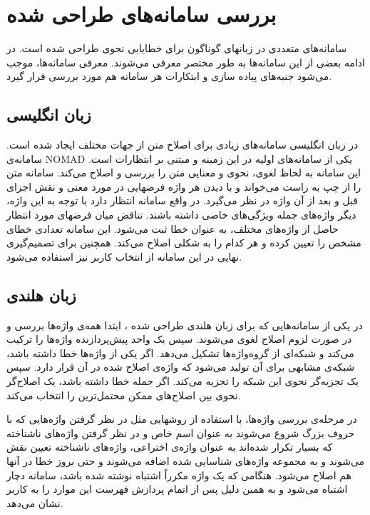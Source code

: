 \documentclass{report}
\begin{document}
\section{بررسی سامانه‌های طراحی شده}
سامانه‌های متعددی در زبانهای گوناگون برای خطایابی نحوی طراحی شده است. در ادامه بعضی از این سامانه‌ها به طور مختصر معرفی می‌شوند. معرفی سامانه‌ها، موجب می‌شود جنبه‌های پیاده سازی و ابتکارات هر سامانه هم مورد بررسی قرار گیرد. 

\subsection{زبان انگلیسی}
در زبان انگلیسی سامانه‌های زیادی برای اصلاح متن از جهات مختلف ایجاد شده است. سامانه‌ی NOMAD \cite{ct19} یکی از سامانه‌های اولیه در این زمینه و مبتنی بر انتظارات است. این سامانه به لحاظ لغوی، نحوی و معنایی متن را بررسی و اصلاح می‌کند. سامانه متن را از چپ به راست می‌خواند و با دیدن هر واژه فرضهایی در مورد معنی و نقش اجزای قبل و بعد از آن واژه در نظر می‌گیرد. در واقع سامانه انتظار دارد با توجه به این واژه، دیگر واژه‌های جمله ویژگی‌های خاصی داشته باشند. تناقض میان فرضهای مورد انتظار حاصل از واژه‌های مختلف، به عنوان خطا ثبت می‌شود. این سامانه تعدادی خطای مشخص را تعیین کرده و هر کدام را به شکلی اصلاح می‌کند. همچنین برای تصمیم‌گیری نهایی در این سامانه از انتخاب کاربر نیز استفاده می‌شود.

\subsection{زبان هلندی}
در یکی از سامانه‌هایی که برای زبان هلندی طراحی شده \cite{ct14}، ابتدا همه‌ی واژه‌ها بررسی و در صورت لزوم اصلاح لغوی می‌شوند. سپس یک واحد پیش‌پردازنده واژه‌ها را ترکیب می‌کند و شبکه‌ای از گروه‌واژه‌ها تشکیل می‌دهد. اگر یکی از واژه‌ها خطا داشته باشد، شبکه‌ی مشابهی برای آن تولید می‌شود که واژه‌ی اصلاح شده در آن قرار دارد. سپس یک تجزیه‌گر نحوی این شبکه را تجزیه می‌کند. اگر جمله خطا داشته باشد، یک اصلاح‌گر نحوی بین اصلاح‌های ممکن محتمل‌ترین را انتخاب می‌کند.

در مرحله‌ی بررسی واژه‌ها، با استفاده از روشهایی مثل در نظر گرفتن واژه‌هایی که با حروف بزرگ شروع می‌شوند به عنوان اسم خاص و‌ در نظر گرفتن واژه‌های ناشناخته که بسیار تکرار شده‌اند به عنوان واژه‌ی اختراعی، واژه‌های ناشناخته تعیین نقش می‌شوند و به مجموعه واژه‌های شناسایی شده اضافه می‌شوند و حتی بروز خطا در آنها هم اصلاح می‌شود. هنگامی که یک واژه مکرراً اشتباه نوشته شده باشد، سامانه دچار اشتباه می‌شود و به همین دلیل پس از اتمام پردازش فهرست این موارد را به کاربر نشان می‌دهد.
\end{document}
